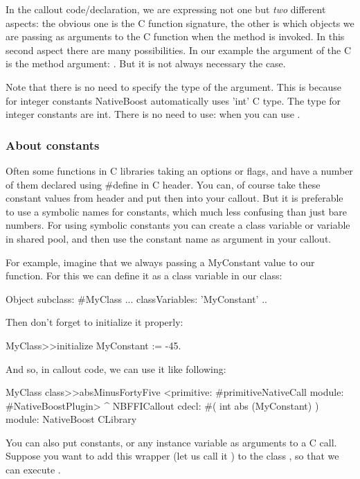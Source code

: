 \documentclass[a4paper,10pt,twoside]{book}
\begin{document}
In the callout code/declaration, we are expressing not one but \emph{two} different aspects: the obvious one is the C function signature, the other
is which objects we are passing as arguments to the C function when the method is invoked. In this second aspect there are many possibilities. In our example the argument of the C is  the method argument: . But it is not always necessary the case.

Note that there is no need to specify the type of the argument. This is
because for integer constants NativeBoost automatically uses 'int' C type.
The type for integer constants are int. There is no need to use: 
when you can use . 


\subsubsection{About constants}
Often some functions in C libraries taking an options or flags, and
have a number of them declared using \#define in C header.
You can, of course take these constant values from header and put then
into your callout. But it is preferable to use a symbolic names for
constants, which much less confusing than just bare numbers.
For using symbolic constants you can create a class variable or
variable in shared pool, and then use the constant name as argument in
your callout.


For example, imagine that we always passing a MyConstant value to our
function. For this we can define it as a class variable in our class:

\begin{code}{}
Object subclass: #MyClass
	...
	classVariables: 'MyConstant'
..
\end{code}
Then don't forget to initialize it properly:

\begin{code}{}
MyClass>>initialize
	MyConstant := -45.
\end{code}

And so, in callout code, we can use it like following:

\begin{code}{}
MyClass class>>absMinusFortyFive
	<primitive: #primitiveNativeCall module: #NativeBoostPlugin>
	^ NBFFICallout cdecl: #( int abs (MyConstant) ) module: NativeBoost CLibrary
\end{code}




You can also put constants,  or any instance variable as arguments to a C call. Suppose you want to add this  wrapper (let us call it ) to the class , so that we can execute .
\end{document}
